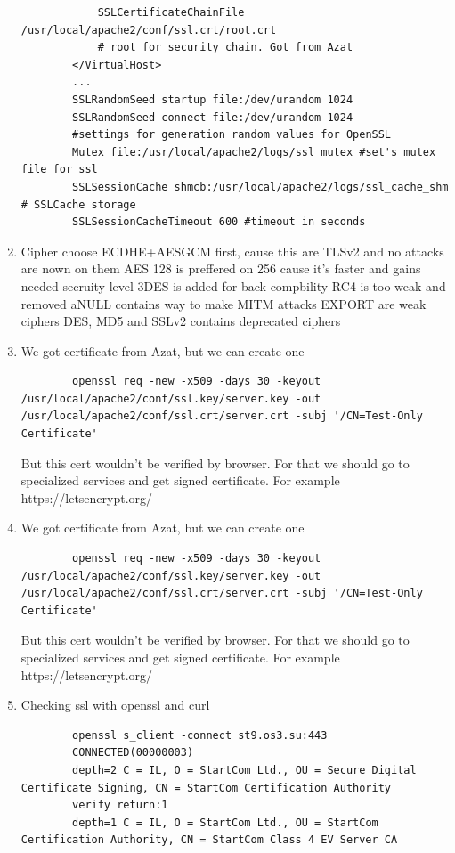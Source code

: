 \documentclass[10pt]{article}
\begin{document}
\begin{enumerate}
\begin{verbatim}
            SSLCertificateChainFile /usr/local/apache2/conf/ssl.crt/root.crt 
            # root for security chain. Got from Azat
        </VirtualHost>
        ...
        SSLRandomSeed startup file:/dev/urandom 1024 
        SSLRandomSeed connect file:/dev/urandom 1024
        #settings for generation random values for OpenSSL
        Mutex file:/usr/local/apache2/logs/ssl_mutex #set's mutex file for ssl
        SSLSessionCache shmcb:/usr/local/apache2/logs/ssl_cache_shm # SSLCache storage
        SSLSessionCacheTimeout 600 #timeout in seconds
    \end{verbatim}
    \item Cipher choose 
        ECDHE+AESGCM first, cause this are TLSv2 and no attacks are nown on them
        AES 128 is preffered on 256 cause it's faster and gains needed secruity level
        3DES is added for back compbility
        RC4 is too weak and removed
        aNULL contains way to make MITM attacks
        EXPORT are weak ciphers
        DES, MD5 and SSLv2 contains deprecated ciphers
    \item We got certificate from Azat, but we can create one 
    \begin{verbatim}
        openssl req -new -x509 -days 30 -keyout /usr/local/apache2/conf/ssl.key/server.key -out /usr/local/apache2/conf/ssl.crt/server.crt -subj '/CN=Test-Only Certificate'
    \end{verbatim}
    But this cert wouldn't be verified by browser. For that we should go to specialized services and get signed certificate. For example https://letsencrypt.org/
    \item We got certificate from Azat, but we can create one 
    \begin{verbatim}
        openssl req -new -x509 -days 30 -keyout /usr/local/apache2/conf/ssl.key/server.key -out /usr/local/apache2/conf/ssl.crt/server.crt -subj '/CN=Test-Only Certificate'
    \end{verbatim}
    But this cert wouldn't be verified by browser. For that we should go to specialized services and get signed certificate. For example https://letsencrypt.org/
    \item Checking ssl with openssl and curl
    \begin{verbatim}
        openssl s_client -connect st9.os3.su:443
        CONNECTED(00000003)
        depth=2 C = IL, O = StartCom Ltd., OU = Secure Digital Certificate Signing, CN = StartCom Certification Authority
        verify return:1
        depth=1 C = IL, O = StartCom Ltd., OU = StartCom Certification Authority, CN = StartCom Class 4 EV Server CA

\end{verbatim}
\end{enumerate}
\end{document}
